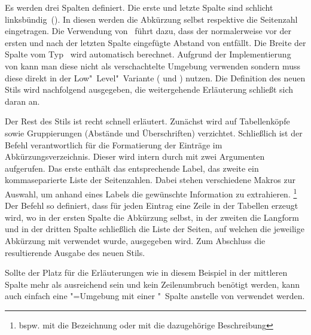\documentclass[%
  english,ngerman,%
  geometry=no,DIV=12,automark,%
]{tudscrartcl}
\begin{document}
Es werden drei Spalten definiert. Die erste und letzte Spalte sind schlicht 
linksbündig~(). In diesen werden die Abkürzung selbst respektive die 
Seitenzahl eingetragen. Die Verwendung von~ führt dazu, dass der 
normalerweise vor der ersten und nach der letzten Spalte eingefügte Abstand von 
 entfällt. Die Breite der Spalte vom Typ~ wird 
automatisch berechnet. Aufgrund der Implementierung von  
kann man diese nicht als verschachtelte Umgebung verwenden sondern muss diese 
direkt in der Low"~Level"~Variante ( und ) 
nutzen. Die Definition des neuen Stils  wird nachfolgend 
ausgegeben, die weitergehende Erläuterung schließt sich daran an.
%
\CodeHook{\let\newglossarystyle\renewglossarystyle}
\begin{Preamble*}

\end{Preamble*}
%
Der Rest des Stils ist recht schnell erläutert. Zunächst wird auf Tabellenköpfe 
sowie Gruppierungen (Abstände und Überschriften) verzichtet. Schließlich ist 
der Befehl  verantwortlich für die Formatierung der Einträge 
im Abkürzungsverzeichnis. Dieser wird intern durch  mit 
zwei Argumenten aufgerufen. Das erste enthält das entsprechende Label, das 
zweite ein kommaseparierte Liste der Seitenzahlen. Dabei stehen verschiedene 
Makros zur Auswahl, um anhand eines Labels die gewünschte Information zu 
extrahieren.%
\footnote{%
  bspw. mit  die Bezeichnung oder mit 
   die dazugehörige Beschreibung%
}
Der Befehl  so definiert, dass für jeden Eintrag eine Zeile 
in der Tabellen erzeugt wird, wo in der ersten Spalte die Abkürzung selbst, in 
der zweiten die Langform und in der dritten Spalte schließlich die Liste der 
Seiten, auf welchen die jeweilige Abkürzung mit  
verwendet wurde, ausgegeben wird. Zum Abschluss die resultierende Ausgabe des 
neuen Stils.
%
\begin{Hint}
\printacronyms[style=acrotabularx]
\end{Hint}
\begin{quoting}[rightmargin=0pt]
\vspace*{-\baselineskip}
\InputCode
\end{quoting}
%
Sollte der Platz für die Erläuterungen wie in diesem Beispiel in der mittleren 
Spalte mehr als ausreichend sein und kein Zeilenumbruch benötigt werden, kann 
auch einfach eine "=Umgebung mit einer "~Spalte 
anstelle von  verwendet werden.
\end{document}
